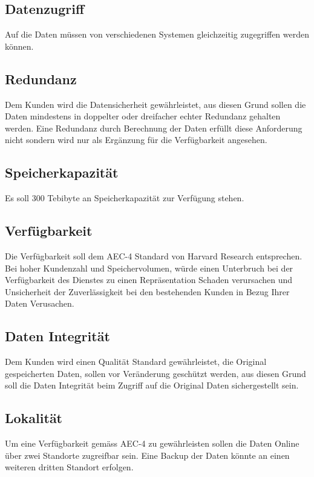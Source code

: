 \subsection{Datenzugriff}
Auf die Daten müssen von verschiedenen Systemen gleichzeitig zugegriffen werden können.

\subsection{Redundanz}
Dem Kunden wird die Datensicherheit gewährleistet, aus diesen Grund sollen die Daten mindestens in doppelter oder dreifacher echter Redundanz gehalten werden.  Eine Redundanz durch Berechnung der Daten erfüllt diese Anforderung nicht sondern wird nur als Ergänzung für die Verfügbarkeit angesehen.

\subsection{Speicherkapazität}
Es soll 300 Tebibyte an Speicherkapazität zur Verfügung stehen.

\subsection{Verfügbarkeit}
Die Verfügbarkeit soll dem AEC-4 Standard von Harvard Research entsprechen. Bei hoher Kundenzahl und Speichervolumen, würde einen Unterbruch bei der Verfügbarkeit des Dienstes zu einen Repräsentation Schaden verursachen und Unsicherheit der Zuverlässigkeit bei den bestehenden Kunden in Bezug Ihrer Daten Verusachen.

\subsection{Daten Integrität}
Dem Kunden wird einen Qualität Standard gewährleistet, die Original gespeicherten Daten, sollen vor Veränderung geschützt werden, aus diesen Grund soll die Daten Integrität beim Zugriff auf die Original Daten sichergestellt sein.

\subsection{Lokalität}
Um eine Verfügbarkeit gemäss AEC-4 zu gewährleisten sollen die Daten Online über zwei Standorte zugreifbar sein. Eine Backup der Daten könnte an einen weiteren dritten Standort erfolgen.